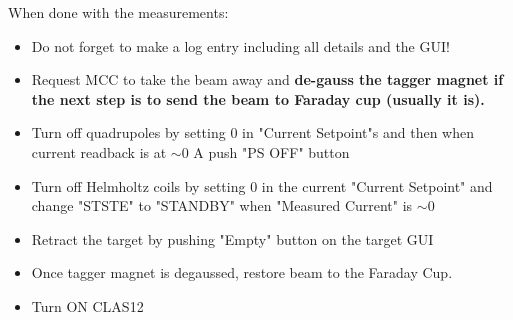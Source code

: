 When done with the measurements:
\begin{itemize}
\item Do not forget to make a log entry including all details and the GUI! 


\item Request MCC to take the beam away and \textbf{de-gauss the tagger
magnet if the next step is to send the beam to Faraday cup (usually it is).}

\item Turn off quadrupoles by setting $0$ in "Current Setpoint"s and then when current readback is at $\sim 0$ A push "PS OFF" button

\item Turn off Helmholtz coils by setting $0$ in the current "Current Setpoint" and change "STSTE" to "STANDBY" when "Measured Current" is $\sim 0$

\item Retract the target by pushing "Empty" button on the target GUI

\item Once tagger magnet is degaussed, restore beam to the Faraday Cup.

\item Turn ON CLAS12
\end{itemize}





